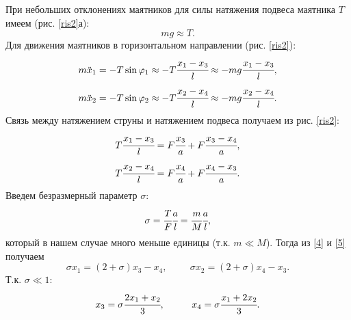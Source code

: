 \documentclass[a4paper,12pt]{article}
\theoremstyle{plain} %
\theoremstyle{definition} %
\theoremstyle{remark} %
\begin{document}
При небольших отклонениях маятников для силы натяжения подвеса маятника $T$ имеем (рис. \ref{ris2}а):
\begin{equation}
mg \approx T.
\label{1}
\end{equation}
Для движения маятников в горизонтальном направлении (рис. \ref{ris2}):
\begin{equation}
m\ddot{x}{_1} = -T\sin\varphi_1 \approx -T\cfrac{x_1-x_3}{l} \approx -mg\cfrac{x_1-x_3}{l},
\label{2}
\end{equation}
\begin{equation}
m\ddot{x}{_2} = -T\sin\varphi_2 \approx -T\cfrac{x_2-x_4}{l} \approx -mg\cfrac{x_2-x_4}{l}.
\label{3}
\end{equation}
Связь между натяжением струны и натяжением подвеса получаем
из рис. \ref{ris2}:
\begin{equation}
T\cfrac{x_1-x_3}{l}=F\cfrac{x_3}{a}+F\cfrac{x_3-x_4}{a},
\label{4}
\end{equation}
\begin{equation}
T\cfrac{x_2-x_4}{l}=F\cfrac{x_4}{a}+F\cfrac{x_4-x_3}{a}.
\label{5}
\end{equation}
Введем безразмерный параметр $\sigma$:
$$\sigma = \cfrac{T}{F}\cfrac{a}{l}=\cfrac{m}{M}\cfrac{a}{l},$$
который в нашем случае много меньше единицы (т.к. $m \ll M$). Тогда из \eqref{4} и \eqref{5} получаем 
\begin{equation}
\sigma x_1=(2+\sigma)x_3-x_4,\hspace{1cm}\sigma x_2=(2+\sigma)x_4-x_3.
\label{6}
\end{equation}
Т.к. $\sigma \ll 1$:
\begin{equation}
x_3=\sigma\cfrac{2x_1+x_2}{3},\hspace{1cm} x_4=\sigma\cfrac{x_1+2x_2}{3}.
\label{7}
\end{equation}
\end{document}
